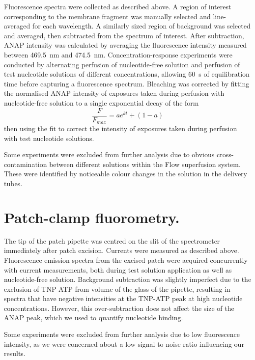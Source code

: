 Fluorescence spectra were collected as described above.
A region of interest corresponding to the membrane fragment was manually selected and line-averaged for each wavelength.
A similarly sized region of background was selected and averaged, then subtracted from the spectrum of interest.
After subtraction, ANAP intensity was calculated by averaging the fluorescence intensity measured between \SI{469.5}{\nano\metre} and \SI{474.5}{\nano\metre}.
Concentration-response experiments were conducted by alternating perfusion of nucleotide-free solution and perfusion of test nucleotide solutions of different concentrations, allowing \SI{60}{\second} of equilibration time before capturing a fluorescence spectrum.
Bleaching was corrected by fitting the normalised ANAP intensity of exposures taken during perfusion with nucleotide-free solution to a single exponential decay of the form
\begin{equation} \label{eq:bleaching}
    \frac{F}{F_{max}} = ae^{kt} + (1 - a)
\end{equation}
then using the fit to correct the intensity of exposures taken during perfusion with test nucleotide solutions.

Some experiments were excluded from further analysis due to obvious cross-contamination between different solutions within the \si{\micro}Flow superfusion system.
These were identified by noticeable colour changes in the solution in the delivery tubes.

\section{Patch-clamp fluorometry.}
The tip of the patch pipette was centred on the slit of the spectrometer immediately after patch excision.
Currents were measured as described above.
Fluorescence emission spectra from the excised patch were acquired concurrently with current measurements, both during test solution application as well as nucleotide-free solution.
Background subtraction was slightly imperfect due to the exclusion of TNP-ATP from volume of the glass of the pipette, resulting in spectra that have negative intensities at the TNP-ATP peak at high nucleotide concentrations.
However, this over-subtraction does not affect the size of the ANAP peak, which we used to quantify nucleotide binding.

Some experiments were excluded from further analysis due to low fluorescence intensity, as we were concerned about a low signal to noise ratio influencing our results.

